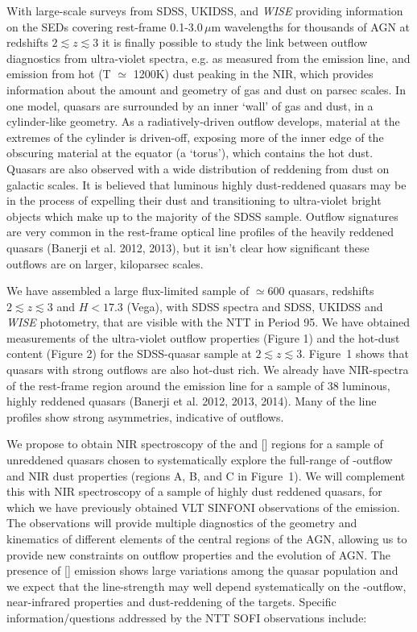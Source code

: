 With large-scale surveys from SDSS, UKIDSS, and \textit{WISE}
providing information on the SEDs covering rest-frame 0.1-3.0\,$\mu$m
wavelengths for thousands of AGN at redshifts $2 \lesssim z \lesssim
3$ it is finally possible to study the link between outflow
diagnostics from ultra-violet spectra, e.g. as measured from the
 emission line, and emission from hot (T $\simeq$ 1200K)
dust peaking in the NIR, which provides information about the amount
and geometry of gas and dust on parsec scales. In one model, quasars
are surrounded by an inner `wall' of gas and dust, in a cylinder-like
geometry. As a radiatively-driven outflow develops, material at the
extremes of the cylinder is driven-off, exposing more of the inner
edge of the obscuring material at the equator (a `torus'), which
contains the hot dust. Quasars are also observed with a wide
distribution of reddening from dust on galactic scales. It is believed
that luminous highly dust-reddened quasars may be in the process of
expelling their dust and transitioning to ultra-violet bright objects
which make up to the majority of the SDSS sample. Outflow signatures
are very common in the rest-frame optical \ha line profiles of
the heavily reddened quasars (Banerji et al. 2012, 2013), but it isn't
clear how significant these outflows are on larger, kiloparsec scales.

We have assembled a large flux-limited sample of $\simeq$600 quasars,
redshifts $2 \lesssim z \lesssim 3$ and $H<17.3$ (Vega), with SDSS
spectra and SDSS, UKIDSS and \textit{WISE} photometry, that are
visible with the NTT in Period 95. We have obtained measurements of
the ultra-violet outflow properties (Figure 1) and the hot-dust
content (Figure 2) for the SDSS-quasar sample at $2 \lesssim z
\lesssim 3$. Figure~1 shows that quasars with strong  outflows are
also hot-dust rich. We already have NIR-spectra of the rest-frame
region around the \ha emission line for a sample of 38 luminous,
highly reddened quasars (Banerji et al. 2012, 2013, 2014). Many of the 
\ha line profiles show strong asymmetries, indicative of outflows.

\vspace{1.5mm}

We propose to obtain NIR spectroscopy of the \hb and []
regions for a sample of unreddened quasars chosen to systematically
explore the full-range of -outflow and NIR dust
properties (regions A, B, and C in Figure~1). We will complement this
with NIR spectroscopy of a sample of highly dust reddened quasars, for
which we have previously obtained VLT SINFONI observations of the
\ha emission. The observations will provide multiple diagnostics
of the geometry and kinematics of different elements of the central
regions of the AGN, allowing us to provide new constraints on outflow
properties and the evolution of AGN. The presence of []
emission shows large variations among the quasar population and we
expect that the line-strength may well depend systematically on the
-outflow, near-infrared properties and dust-reddening of the
targets. Specific information/questions addressed by the NTT SOFI
observations include:

